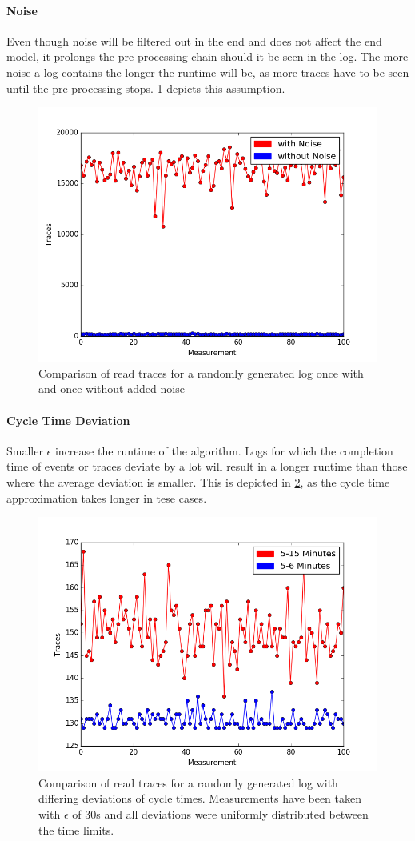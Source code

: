 \documentclass[
	a4paper,
	pagesize,
	pdftex,
	12pt,
	twoside, %
	BCOR=5mm, %
	ngerman,
	fleqn,
	final,
	]{scrartcl}
\begin{document}
\paragraph{Noise}
Even though noise will be filtered out in the end and does not affect the end model, it prolongs the pre processing chain should it be seen in the log. The more noise a log contains the longer the runtime will be, as more traces have to be seen until the pre processing stops. \ref{fig:noise} depicts this assumption.
\begin{figure}[h]
	\begin{center}
		\includegraphics[width=.5\linewidth]{img/Noise_Noiseless.png}
	\end{center}
	  \vspace{-10pt}
	\caption{Comparison of read traces for a randomly generated log once with and once without added noise}
	\label{fig:noise}
\end{figure}
\paragraph{Cycle Time Deviation}
Smaller $\epsilon$ increase the runtime of the algorithm. Logs for which the completion time of events or traces deviate by a lot will result in a longer runtime than those where the average deviation is smaller. This is depicted in \ref{fig:deviation}, as the cycle time approximation takes longer in tese cases.
\begin{figure}[h]
	\begin{center}
		\includegraphics[width=.5\linewidth]{img/high_vs_low_deviation.png}
	\end{center}
	  \vspace{-10pt}
	\caption{Comparison of read traces for a randomly generated log with differing deviations of cycle times. Measurements have been taken with $\epsilon$ of 30s and all deviations were uniformly distributed between the time limits.}
	\label{fig:deviation}
\end{figure}
\end{document}
